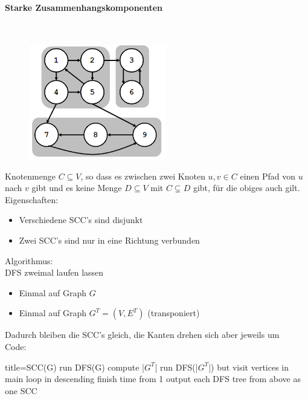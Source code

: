\documentclass[
    ngerman,
    color=3b,
    dark_mode,
    load_common, %
    summary,
    boxarc,
]{tuda_summary}
\begin{document}
\paragraph{Starke Zusammenhangskomponenten}\mbox{}\vspace{-1em}\\
\begin{figure}
    \centering
    \includegraphics[width=6cm]{pictures/scc.PNG}
\end{figure}
Knotenmenge $C \subseteq V$, so dass es zwischen zwei Knoten $u,v \in C$ einen Pfad von $u$ nach $v$ gibt und es keine Menge $D \subseteq V$ mit $C \subsetneq D$ gibt, für die obiges auch gilt.\\
Eigenschaften:
\begin{itemize}
    \item Verschiedene SCC's sind disjunkt
    \item Zwei SCC's sind nur in eine Richtung verbunden
\end{itemize}
Algorithmus:\\
DFS zweimal laufen lassen
\begin{itemize}
    \item Einmal auf Graph $G$
    \item Einmal auf Graph $G^T = (V,E^T)$ (transponiert)
\end{itemize}
Dadurch bleiben die SCC's gleich, die Kanten drehen sich aber jeweils um\vspace{2em}\\
Code:
\begin{codeBlock}[autogobble,escapeinside=||]{title={SCC(G)}}
run DFS(G)
compute |$G^T$|
run DFS(|$G^T$|) but visit vertices in main loop
    in descending finish time from 1
output each DFS tree from above as one SCC
\end{codeBlock}
\end{document}
